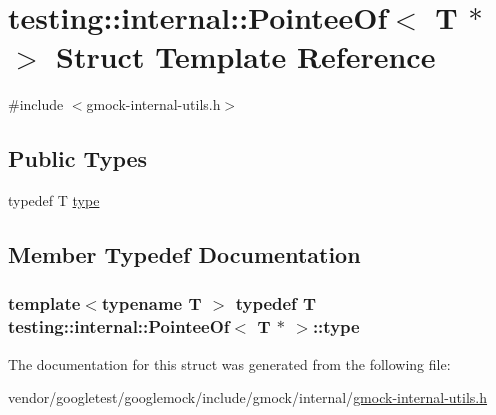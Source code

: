 \hypertarget{structtesting_1_1internal_1_1PointeeOf_3_01T_01_5_01_4}{}\section{testing\+:\+:internal\+:\+:Pointee\+Of$<$ T $\ast$ $>$ Struct Template Reference}
\label{structtesting_1_1internal_1_1PointeeOf_3_01T_01_5_01_4}


{\ttfamily \#include $<$gmock-\/internal-\/utils.\+h$>$}

\subsection*{Public Types}
\begin{DoxyCompactItemize}
\item 
typedef T \hyperlink{structtesting_1_1internal_1_1PointeeOf_3_01T_01_5_01_4_a91dde514cd3a8c07cedbe5336c36a55f}{type}
\end{DoxyCompactItemize}


\subsection{Member Typedef Documentation}
\subsubsection[{\texorpdfstring{type}{type}}]{\setlength{\rightskip}{0pt plus 5cm}template$<$typename T $>$ typedef T {\bf testing\+::internal\+::\+Pointee\+Of}$<$ T $\ast$ $>$\+::{\bf type}}\hypertarget{structtesting_1_1internal_1_1PointeeOf_3_01T_01_5_01_4_a91dde514cd3a8c07cedbe5336c36a55f}{}\label{structtesting_1_1internal_1_1PointeeOf_3_01T_01_5_01_4_a91dde514cd3a8c07cedbe5336c36a55f}


The documentation for this struct was generated from the following file\+:\begin{DoxyCompactItemize}
\item 
vendor/googletest/googlemock/include/gmock/internal/\hyperlink{gmock-internal-utils_8h}{gmock-\/internal-\/utils.\+h}\end{DoxyCompactItemize}
